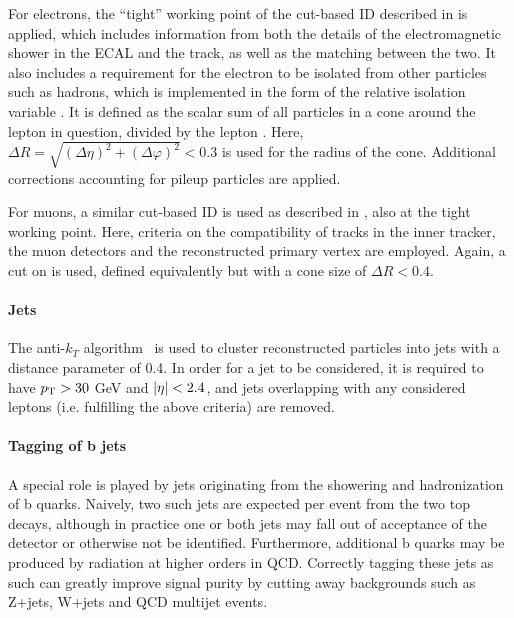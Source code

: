 For electrons, the ``tight'' working point of the cut-based ID described in  is applied, which includes information from both the details of the electromagnetic shower in the ECAL and the track, as well as the matching between the two. It also includes a requirement for the electron to be isolated from other particles such as hadrons, which is implemented in the form of the relative isolation variable \Irel. It is defined as the scalar \pt sum of all particles in a cone around the lepton in question, divided by the lepton \pt. Here, $\Delta R = \sqrt{(\Delta \eta)^2 + (\Delta \varphi)^2} < 0.3$ is used for the radius of the cone. Additional corrections accounting for pileup particles are applied.

For muons, a similar cut-based ID is used as described in , also at the tight working point. Here, criteria on the compatibility of tracks in the inner tracker, the muon detectors and the reconstructed primary vertex are employed. Again, a cut on \Irel is used, defined equivalently but with a cone size of $\Delta R < 0.4$.

\paragraph{Jets}

The anti-$k_T$ algorithm~\cite{Cacciari:2008gp} is used to cluster reconstructed particles into jets with a distance parameter of 0.4. In order for a jet to be considered, it is required to have $p_{\mathrm{T}} > 30$ GeV and $|\eta| < 2.4$, and jets overlapping with any considered leptons (i.e. fulfilling the above criteria) are removed. %

\paragraph{Tagging of b jets}

A special role is played by jets originating from the showering and hadronization of b quarks. Naively, two such jets are expected per \ttbar event from the two top decays, although in practice one or both jets may fall out of acceptance of the detector or otherwise not be identified. Furthermore, additional b quarks may be produced by radiation at higher orders in QCD. Correctly tagging these jets as such can greatly improve signal purity by cutting away backgrounds such as Z+jets, W+jets and QCD multijet events.

